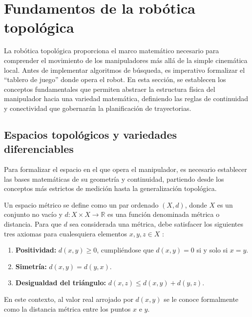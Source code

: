 
\section{Fundamentos de la robótica topológica}
La robótica topológica proporciona el marco matemático necesario para comprender 
el movimiento de los manipuladores más allá de la simple cinemática local. 
Antes de implementar algoritmos de búsqueda, es imperativo formalizar el \enquote{tablero de juego} 
donde opera el robot. En esta sección, se establecen los conceptos fundamentales que 
permiten abstraer la estructura física del manipulador hacia una variedad matemática, 
definiendo las reglas de continuidad y conectividad que gobernarán la planificación de 
trayectorias.



\subsection{Espacios topológicos y variedades diferenciables}

Para formalizar el espacio en el que opera el manipulador, es necesario establecer 
las bases matemáticas de su geometría y continuidad, partiendo desde los conceptos más 
estrictos de medición hasta la generalización topológica.

\begin{definition}
Un espacio métrico se define como un par ordenado $(X, d)$, donde $X$ es un 
conjunto no vacío y $d: X \times X \to \mathbb{R}$ es una función denominada 
métrica o distancia. Para que $d$ sea considerada una métrica, debe satisfacer 
los siguientes tres axiomas para cualesquiera elementos $x, y, z \in X$ \parencite{antonyan2016topologia}:

\begin{enumerate}
    \item \textbf{Positividad:} $d(x, y) \ge 0$, cumpliéndose que $d(x, y) = 0$ si y solo si $x = y$.
    \item \textbf{Simetría:} $d(x, y) = d(y, x)$.
    \item \textbf{Desigualdad del triángulo:} $d(x, z) \le d(x, y) + d(y, z)$.
\end{enumerate}

En este contexto, al valor real arrojado por $d(x, y)$ se le conoce formalmente 
como la distancia métrica entre los puntos $x$ e $y$.
\end{definition}

